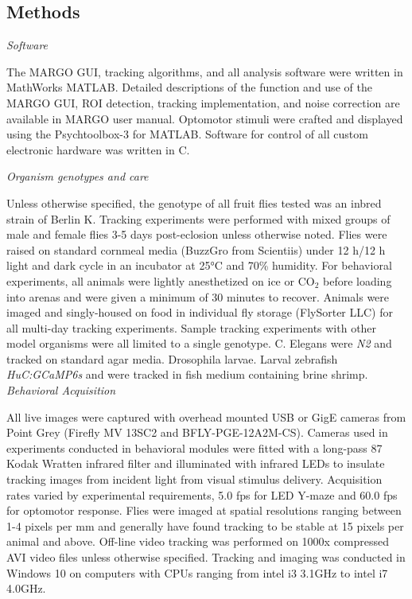 \documentclass[10pt]{article}
\begin{document}
\begin{multicols}{2}
\section*{Methods}

\textit{Software}

The MARGO GUI, tracking algorithms, and all analysis software were written in MathWorks MATLAB. Detailed descriptions of the function and use of the MARGO GUI, ROI detection, tracking implementation, and noise correction are available in MARGO user manual. Optomotor stimuli were crafted and displayed using the Psychtoolbox-3 for MATLAB. Software for control of all custom electronic hardware was written in C.

\textit{Organism genotypes and care}

Unless otherwise specified, the genotype of all fruit flies tested was an inbred strain of  Berlin K. Tracking experiments were performed with mixed groups of male and female flies 3-5 days post-eclosion unless otherwise noted.  Flies were raised on standard cornmeal media (BuzzGro from Scientiis) under 12 h/12 h light and dark cycle in an incubator at 25°C and 70\% humidity. For behavioral experiments, all animals were lightly anesthetized on ice or CO$_2$ before loading into arenas and were given a minimum of 30 minutes to recover. Animals were imaged and singly-housed on food in individual fly storage (FlySorter LLC) for all multi-day tracking experiments. Sample tracking experiments with other model organisms were all limited to a single genotype. C. Elegans were \textit{N2} and tracked on standard agar media. Drosophila larvae. Larval zebrafish \textit{HuC:GCaMP6s} and were tracked in fish medium containing brine shrimp.
\textit{Behavioral Acquisition}

All live images were captured with overhead mounted USB or GigE cameras from Point Grey (Firefly MV 13SC2 and BFLY-PGE-12A2M-CS). Cameras used in experiments conducted in behavioral modules were fitted with a long-pass 87 Kodak Wratten infrared filter and illuminated with infrared LEDs to insulate tracking images from incident light from visual stimulus delivery. Acquisition rates varied by experimental requirements, 5.0 fps for LED Y-maze and 60.0 fps for optomotor response. Flies were imaged at spatial resolutions ranging between 1-4 pixels per mm and generally have found tracking to be stable at 15 pixels per animal and above.  Off-line video tracking was performed on 1000x compressed AVI video files unless otherwise specified. Tracking and imaging was conducted in Windows 10 on computers with CPUs ranging from intel i3 3.1GHz to intel i7 4.0GHz. 


\end{multicols}
\end{document}
